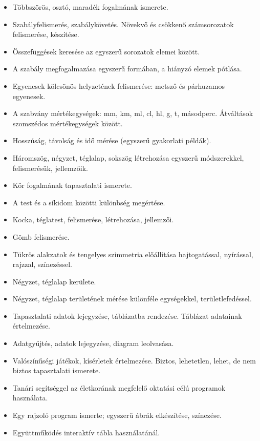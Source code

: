 \begin{itemize}
\item Többszörös, osztó, maradék fogalmának ismerete.
\item Szabályfelismerés, szabálykövetés. Növekvő és csökkenő számsorozatok felismerése, készítése.
\item Összefüggések keresése az egyszerű sorozatok elemei között.
\item A szabály megfogalmazása egyszerű formában, a hiányzó elemek pótlása.
\item Egyenesek kölcsönös helyzetének felismerése: metsző és párhuzamos egyenesek.
\item A szabvány mértékegységek: mm, km, ml, cl, hl, g, t, másodperc. Átváltások szomszédos mértékegységek között.
\item Hosszúság, távolság és idő mérése (egyszerű gyakorlati példák).
\item Háromszög, négyzet, téglalap, sokszög létrehozása egyszerű módszerekkel, felismerésük, jellemzőik.
\item Kör fogalmának tapasztalati ismerete.
\item A test és a síkidom közötti különbség megértése.
\item Kocka, téglatest, felismerése, létrehozása, jellemzői.
\item Gömb felismerése.
\item Tükrös alakzatok és tengelyes szimmetria előállítása hajtogatással, nyírással, rajzzal, színezéssel.
\item Négyzet, téglalap kerülete.
\item Négyzet, téglalap területének mérése különféle egységekkel, területlefedéssel.
\item Tapasztalati adatok lejegyzése, táblázatba rendezése. Táblázat adatainak értelmezése.
\item Adatgyűjtés, adatok lejegyzése, diagram leolvasása.
\item Valószínűségi játékok, kísérletek értelmezése. Biztos, lehetetlen, lehet, de nem biztos tapasztalati ismerete.
\item Tanári segítséggel az életkorának megfelelő oktatási célú programok használata.
\item Egy rajzoló program ismerte; egyszerű ábrák elkészítése, színezése.
\item Együttműködés interaktív tábla használatánál.
\end{itemize}

